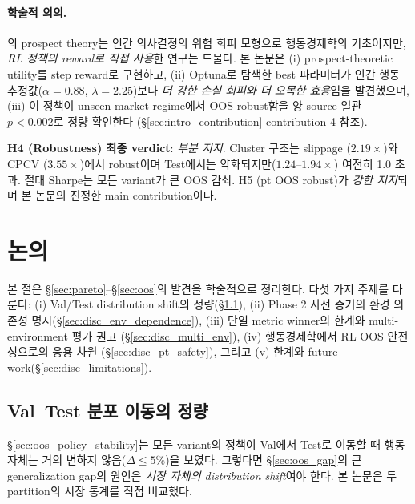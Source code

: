 \documentclass[11pt, a4paper]{article}
\begin{document}
\paragraph{학술적 의의.}
\citet{kahneman1979prospect}의 prospect theory는 인간 의사결정의 위험 회피
모형으로 행동경제학의 기초이지만, \emph{RL 정책의 reward로 직접 사용}한 연구는
드물다. 본 논문은 (i) prospect-theoretic utility를 step reward로 구현하고,
(ii) Optuna로 탐색한 best 파라미터가 인간 행동 추정값($\alpha=0.88$,
$\lambda=2.25$)보다 \emph{더 강한 손실 회피와 더 오목한 효용}임을 발견했으며,
(iii) 이 정책이 unseen market regime에서 OOS robust함을 양 source 일관
$p < 0.002$로 정량 확인한다 (\S\ref{sec:intro_contribution} contribution 4
참조).

\textbf{H4 (Robustness) 최종 verdict}: \emph{부분 지지}. Cluster 구조는
slippage ($2.19\times$)와 CPCV ($3.55\times$)에서 robust이며 Test에서는
약화되지만($1.24$--$1.94\times$) 여전히 1.0 초과. 절대 Sharpe는 모든 variant가
큰 OOS 감쇠. H5 (pt OOS robust)가 \emph{강한 지지}되며 본 논문의 진정한 main
contribution이다.

\section{논의}
\label{sec:discussion}

본 절은 \S\ref{sec:pareto}--\S\ref{sec:oos}의 발견을 학술적으로 정리한다.
다섯 가지 주제를 다룬다: (i) Val/Test distribution shift의 정량(\S\ref{sec:disc_shift}),
(ii) Phase 2 사전 증거의 환경 의존성 명시(\S\ref{sec:disc_env_dependence}),
(iii) 단일 metric winner의 한계와 multi-environment 평가 권고
(\S\ref{sec:disc_multi_env}), (iv) 행동경제학에서 RL OOS 안전성으로의 응용 차원
(\S\ref{sec:disc_pt_safety}), 그리고 (v) 한계와 future work(\S\ref{sec:disc_limitations}).

\subsection{Val--Test 분포 이동의 정량}
\label{sec:disc_shift}

\S\ref{sec:oos_policy_stability}는 모든 variant의 정책이 Val에서 Test로 이동할
때 행동 자체는 거의 변하지 않음($\Delta \leq 5\%$)을 보였다. 그렇다면 \S\ref{sec:oos_gap}의
큰 generalization gap의 원인은 \emph{시장 자체의 distribution shift}여야 한다.
본 논문은 두 partition의 시장 통계를 직접 비교했다.
\end{document}
